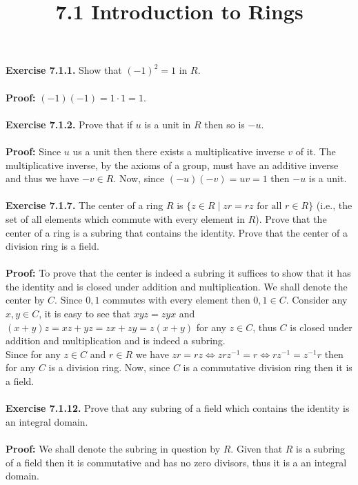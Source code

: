 \documentclass{article}
\title{\textbf{7.1 Introduction to Rings}}
\begin{document}
	\maketitle
	\textbf{Exercise 7.1.1.} Show that $(-1)^2 = 1$ in $R$. \\ \\
	\textbf{Proof:} $(-1)(-1) = 1 \cdot 1 = 1$. \\ \\
	\textbf{Exercise 7.1.2.} Prove that if $u$ is a unit in $R$ then so is $-u$. \\ \\
	\textbf{Proof:} Since $u$ us a unit then there exists a multiplicative inverse $v$ of it. The multiplicative inverse, by the axioms of a group, must have an additive inverse and thus we have $-v \in R$. Now, since $(-u)(-v) = uv = 1$ then $-u$ is a unit.\\ \\
	\textbf{Exercise 7.1.7.} The center of a ring $R$ is $\{ z \in R \;|\; zr = rz \text{ for all } r \in R \}$ (i.e., the set of all elements which commute with every element in $R$). Prove that the center of a ring is a subring that contains the identity. Prove that the center of a division ring is a field. \\ \\
	\textbf{Proof:} To prove that the center is indeed a subring it suffices to show that it has the identity and is closed under addition and multiplication. We shall denote the center by $C$. Since $0, 1$ commutes with every element then $0, 1 \in C$. Consider any $x, y \in C$, it is easy to see that $xyz = zyx$ and $(x + y)z = xz + yz = zx + zy = z(x + y)$ for any $z \in C$, thus $C$ is closed under addition and multiplication and is indeed a subring. \\ 
	Since for any $z \in C$ and $r \in R$ we have $zr = rz \iff zrz^{-1} = r \iff rz^{-1} = z^{-1}r$ then for any $C$ is a division ring. Now, since $C$ is a commutative division ring then it is a field. \\ \\
	\textbf{Exercise 7.1.12.} Prove that any subring of a field which contains the identity is an integral domain. \\ \\
	\textbf{Proof:} We shall denote the subring in question by $R$. Given that $R$ is a subring of a field then it is commutative and has no zero divisors, thus it is a an integral domain.
\end{document}

